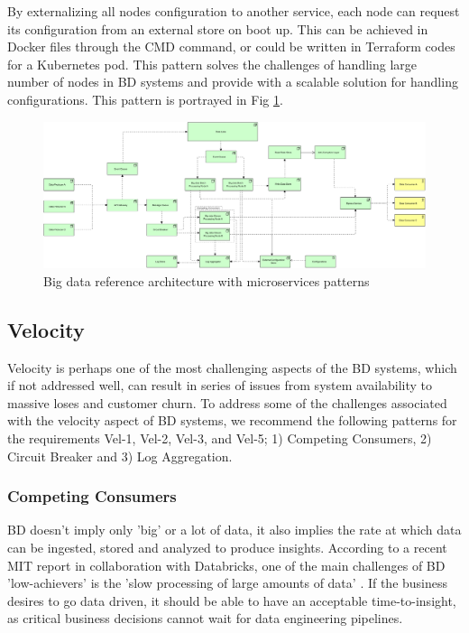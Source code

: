 \documentclass[a4paper,11pt,article,oneside]{memoir}
\begin{document}
By externalizing all nodes configuration to another service, each node can request its configuration from an external store on boot up. This can be achieved in Docker files through the CMD command, or could be written in Terraform codes for a Kubernetes pod. This pattern solves the challenges of handling large number of nodes in BD systems and provide with a scalable solution for handling configurations. This pattern is portrayed in Fig \ref{fig:RA}.

\begin{figure}[h]
    \centering 
    \includegraphics[width=17cm]{Media/All together.jpg}
    \caption{Big data reference architecture with microservices patterns}
    \label{fig:RA}
\end{figure}

\subsection{Velocity}

Velocity is perhaps one of the most challenging aspects of the BD systems, which if not addressed well, can result in series of issues from system availability to massive loses and customer churn. To address some of the challenges associated with the velocity aspect of BD systems, we recommend the following patterns for the requirements Vel-1, Vel-2, Vel-3, and Vel-5; 1) Competing Consumers, 2) Circuit Breaker and 3) Log Aggregation.

\subsubsection{Competing Consumers}

BD doesn't imply only 'big' or a lot of data, it also implies the rate at which data can be ingested, stored and analyzed to produce insights. According to a recent MIT report in collaboration with Databricks, one of the main challenges of BD 'low-achievers' is the 'slow processing of large amounts of data' \cite{DataBricksSurvey}. If the business desires to go data driven, it should be able to have an acceptable time-to-insight, as critical business decisions cannot wait for data engineering pipelines. 
\end{document}
